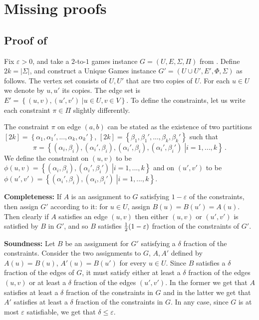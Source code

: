 \documentclass{toc}
\newcommand\card[1]{\left| {#1} \right|}
\newcommand\sett[2]{\left\{ \left. #1 \;\right\vert #2 \right\}}
\newcommand\set[1]{{\left\{ #1 \right\}}}
\newcommand\half{{1\over2}}
\newcommand\eps{\varepsilon}
\renewcommand\leq{\leqslant}
\begin{document}
%


\appendix
\section{Missing proofs}
\subsection{Proof of }\label{sec:proof_ugc_cor}
Fix $\eps>0$, and take a $2$-to-$1$ games instance $G=(U,E,\Sigma,\Pi)$ from .
Define $2k=\card{\Sigma}$, and construct a Unique Games instance $G' = (U\cup U', E',\Phi,\Sigma)$ as follows.
The vertex set consists of $U,U'$ that are two copies of $U$. For each $u\in U$ we denote by
$u, u'$ its copies. The edge set is $E' = \sett{(u,v),(u',v')}{u\in U, v\in V}$. To define the constraints,
let us write each constraint $\pi\in \Pi$ slightly differently.

The constraint $\pi$ on edge $(a,b)$ can be stated as the existence of two partitions $[2k] = \set{\alpha_1,\alpha_1',...,\alpha_k,\alpha_k'}$, $[2k] = \set{\beta_1,\beta_1',...,\beta_k,\beta_k'}$
such that
\[
\pi=\sett{(\alpha_i,\beta_i),(\alpha_i',\beta_i),(\alpha_i',\beta_i),(\alpha_i',\beta_i')}{i=1,...,k}\,.
\]
We define
the constraint on $(u,v)$ to be
$\phi(u,v)=\sett{(\alpha_i,\beta_i),(\alpha_i',\beta_i')}{i=1,...,k}$ and on
$(u',v')$ to be $\phi(u',v')=\sett{(\alpha_i',\beta_i),(\alpha_i,\beta_i')}{ i=1,...,k}$.

\textbf{Completeness:} If $A$ is an assignment to $G$ satisfying $1-\eps$ of the constraints, then assign $G'$ according to it:
for $u\in U$, assign $B(u)=B(u')=A(u)$. Then clearly if $A$ satisfies an edge $(u,v)$ then either $(u,v)$ or $(u',v')$ is
satisfied by $B$ in $G'$, and so $B$ satisfies $\half(1-\eps)$ fraction of the constraints of $G'$.

\textbf{Soundness:} Let $B$ be an assignment for $G'$ satisfying
a %
$\delta$ fraction of the constraints. Consider the two
assignments to $G$, $A,A'$ defined by $A(u) = B(u)$, $A'(u)=B(u')$ for every $u\in U$. Since $B$ satisfies
a %
$\delta$
fraction of the edges of $G$, it must satisfy either at least
a %
$\delta$ fraction of the edges $(u,v)$ or at least
a %
$\delta$ fraction of the edges $(u',v')$. In the former we get that $A$ satisfies at least
a %
$\delta$ fraction
of the constraints in $G$ and in the latter we get that $A'$ satisfies at least
a %
$\delta$ fraction of the
constraints in $G$. In any case, since $G$ is at most $\eps$ satisfiable, we get that $\delta\leq \eps$.
\end{document}
